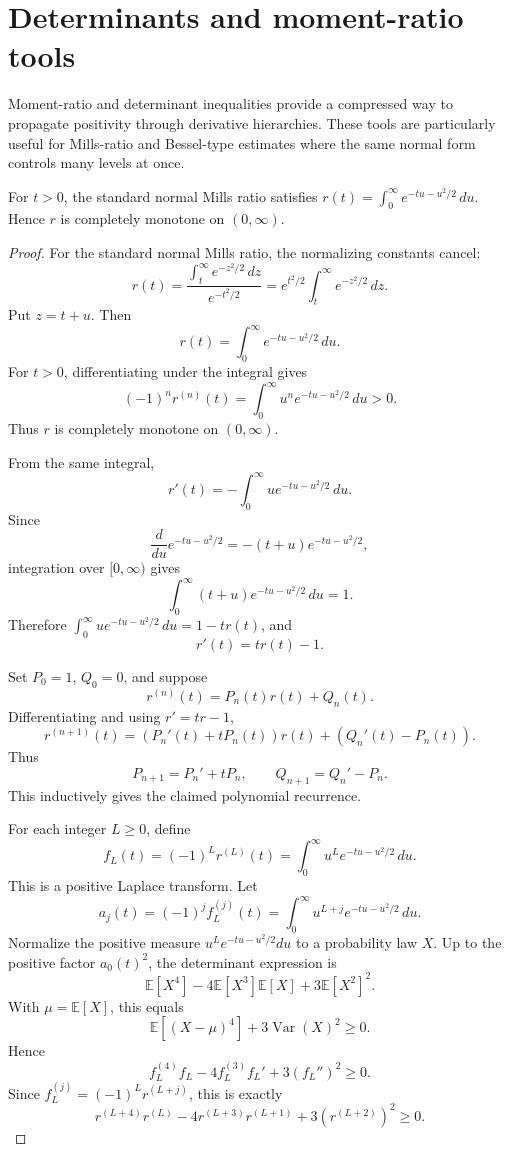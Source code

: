 \section{Determinants and moment-ratio tools}
Moment-ratio and determinant inequalities provide a compressed way to propagate positivity through derivative hierarchies.  These tools are particularly useful for Mills-ratio and Bessel-type estimates where the same normal form controls many levels at once.
\begin{theorem}
\label{res:from-mills-laplace-cm-normal-form}
For \(t>0\), the standard normal Mills ratio satisfies \(r(t)=\int_0^\infty e^{-tu-u^2/2}\,du\). Hence \(r\) is completely monotone on \((0,\infty)\).
\end{theorem}
\begin{proof}
For the standard normal Mills ratio, the normalizing constants cancel:
\[
r(t)=\frac{\int_t^\infty e^{-z^2/2}\,dz}{e^{-t^2/2}}
=e^{t^2/2}\int_t^\infty e^{-z^2/2}\,dz.
\]
Put \(z=t+u\). Then
\[
r(t)=\int_0^\infty e^{-tu-u^2/2}\,du.
\]
For \(t>0\), differentiating under the integral gives
\[
(-1)^n r^{(n)}(t)=\int_0^\infty u^n e^{-tu-u^2/2}\,du>0.
\]
Thus \(r\) is completely monotone on \((0,\infty)\).

From the same integral,
\[
r'(t)=-\int_0^\infty u e^{-tu-u^2/2}\,du.
\]
Since
\[
\frac{d}{du}e^{-tu-u^2/2}=-(t+u)e^{-tu-u^2/2},
\]
integration over \([0,\infty)\) gives
\[
\int_0^\infty (t+u)e^{-tu-u^2/2}\,du=1.
\]
Therefore \(\int_0^\infty u e^{-tu-u^2/2}\,du=1-tr(t)\), and
\[
r'(t)=tr(t)-1.
\]

Set \(P_0=1\), \(Q_0=0\), and suppose
\[
r^{(n)}(t)=P_n(t)r(t)+Q_n(t).
\]
Differentiating and using \(r'=tr-1\),
\[
r^{(n+1)}(t)=(P_n'(t)+tP_n(t))r(t)+(Q_n'(t)-P_n(t)).
\]
Thus
\[
P_{n+1}=P_n'+tP_n,\qquad Q_{n+1}=Q_n'-P_n.
\]
This inductively gives the claimed polynomial recurrence.

For each integer \(L\ge0\), define
\[
f_L(t)=(-1)^L r^{(L)}(t)=\int_0^\infty u^L e^{-tu-u^2/2}\,du.
\]
This is a positive Laplace transform. Let
\[
a_j(t)=(-1)^j f_L^{(j)}(t)=\int_0^\infty u^{L+j}e^{-tu-u^2/2}\,du.
\]
Normalize the positive measure \(u^L e^{-tu-u^2/2}du\) to a probability law \(X\). Up to the positive factor \(a_0(t)^2\), the determinant expression is
\[
\mathbb E[X^4]-4\mathbb E[X^3]\mathbb E[X]+3\mathbb E[X^2]^2.
\]
With \(\mu=\mathbb E[X]\), this equals
\[
\mathbb E[(X-\mu)^4]+3\operatorname{Var}(X)^2\ge0.
\]
Hence
\[
f_L^{(4)}f_L-4f_L^{(3)}f_L'+3(f_L'')^2\ge0.
\]
Since \(f_L^{(j)}=(-1)^L r^{(L+j)}\), this is exactly
\[
r^{(L+4)}r^{(L)}-4r^{(L+3)}r^{(L+1)}+3(r^{(L+2)})^2\ge0.
\]
\end{proof}


